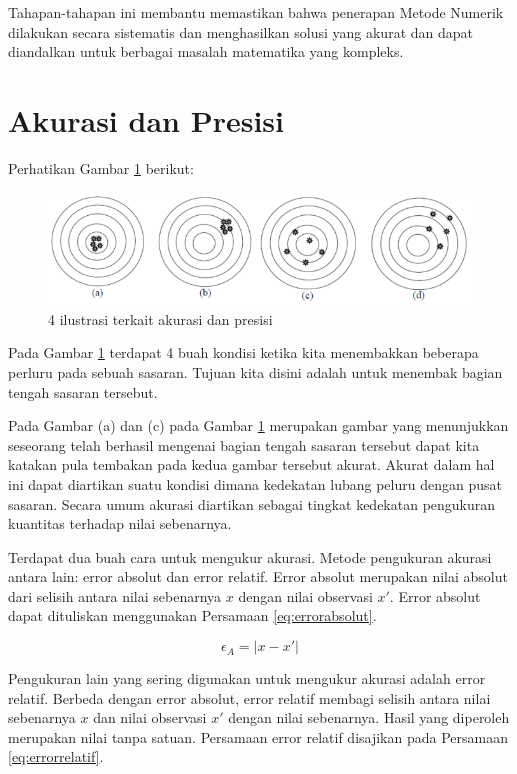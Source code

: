 \documentclass[
]{book}
\theoremstyle{definition}
\theoremstyle{definition}
\theoremstyle{definition}
\theoremstyle{definition}
\theoremstyle{remark}
\begin{document}
Tahapan-tahapan ini membantu memastikan bahwa penerapan Metode Numerik dilakukan secara sistematis dan menghasilkan solusi yang akurat dan dapat diandalkan untuk berbagai masalah matematika yang kompleks.

\hypertarget{acuracy}{%
\section{Akurasi dan Presisi}\label{acuracy}}

Perhatikan Gambar \ref{fig:akurasi} berikut:

\begin{figure}

{\centering \includegraphics[width=0.75\linewidth]{./images/akurasi} 

}

\caption{4 ilustrasi terkait akurasi dan presisi}\label{fig:akurasi}
\end{figure}

Pada Gambar \ref{fig:akurasi} terdapat 4 buah kondisi ketika kita menembakkan beberapa perluru pada sebuah sasaran. Tujuan kita disini adalah untuk menembak bagian tengah sasaran tersebut.

Pada Gambar (a) dan (c) pada Gambar \ref{fig:akurasi} merupakan gambar yang menunjukkan seseorang telah berhasil mengenai bagian tengah sasaran tersebut dapat kita katakan pula tembakan pada kedua gambar tersebut akurat. Akurat dalam hal ini dapat diartikan suatu kondisi dimana kedekatan lubang peluru dengan pusat sasaran. Secara umum akurasi diartikan sebagai tingkat kedekatan pengukuran kuantitas terhadap nilai sebenarnya.

Terdapat dua buah cara untuk mengukur akurasi. Metode pengukuran akurasi antara lain: error absolut dan error relatif. Error absolut merupakan nilai absolut dari selisih antara nilai sebenarnya \(x\) dengan nilai observasi \(x'\). Error absolut dapat dituliskan menggunakan Persamaan \eqref{eq:errorabsolut}.

\begin{equation}
   \epsilon_A=\left|x-x'\right|
  \label{eq:errorabsolut}
\end{equation}

Pengukuran lain yang sering digunakan untuk mengukur akurasi adalah error relatif. Berbeda dengan error absolut, error relatif membagi selisih antara nilai sebenarnya \(x\) dan nilai observasi \(x'\) dengan nilai sebenarnya. Hasil yang diperoleh merupakan nilai tanpa satuan. Persamaan error relatif disajikan pada Persamaan \eqref{eq:errorrelatif}.
\end{document}
